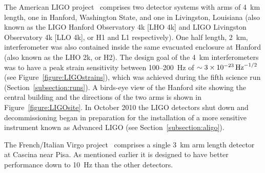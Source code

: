 \documentclass{article}
\begin{document}
The American LIGO project~\cite{LIGOweb} comprises two detector systems with
arms of 4~km length, one in Hanford, Washington State, and one in Livingston,
Louisiana (also known as the LIGO Hanford Observatory 4k [LHO 4k] and LIGO
Livingston Observatory 4k [LLO 4k], or H1 and L1 respectively). One half length,
2~km, interferometer was also contained inside the same evacuated enclosure at
Hanford (also known as the LHO 2k, or H2). The design goal of the 4~km
interferometers was to have a peak strain sensitivity between 100--200~Hz of
$\sim 3\times10^{-23}\,{\rm Hz}^{-1/2}$~\cite{LIGOSRD} (see
Figure~\ref{figure:LIGOstrains}), which was achieved during the fifth science run
(Section~\ref{subsection:runs}). A birds-eye view of the Hanford site showing the
central building and the directions of the two arms is shown in
Figure~\ref{figure:LIGOsite}. In October 2010 the LIGO detectors shut down and
decommissioning began in preparation for the installation of a more sensitive
instrument known as Advanced LIGO (see Section~\ref{subsection:aligo}).


The French/Italian Virgo project~\cite{VIRGOweb} comprises a single 3~km arm
length detector at Cascina near Pisa. As mentioned earlier it is designed to
have better performance down to 10~Hz than the other detectors.
\end{document}
